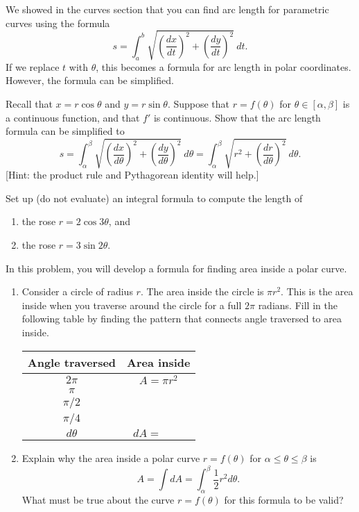 We showed in the curves section that you can find arc length for parametric curves using the formula 
$$s=\int_a^b\sqrt{\left(\frac{dx}{dt}\right)^2+\left(\frac{dy}{dt}\right)^2}\ dt.$$ If we replace $t$ with $\theta$, this becomes a formula for arc length in polar coordinates.  However, the formula can be simplified.

\begin{problem}
Recall that $x=r\cos\theta$ and $y=r\sin\theta$. Suppose that $r=f(\theta)$ for $\theta\in[\alpha,\beta]$ is a continuous function, and that $f'$ is continuous.  
Show that the arc length formula can be simplified to 
$$
s=\int_{\alpha}^{\beta}\sqrt{\left(\frac{dx}{d\theta}\right)^2+\left(\frac{dy}{d\theta}\right)^2}\ d\theta 
= \int_{\alpha}^{\beta}\sqrt{r^2+\left(\frac{dr}{d\theta}\right)^2} \ d\theta.$$
[Hint: the product rule and Pythagorean identity will help.]
\end{problem}

\begin{problem} 
Set up (do not evaluate) an integral formula to compute the length of 
\begin{enumerate}
\item the rose $r=2\cos 3\theta$, and
\item the rose $r=3\sin 2\theta$.
\end{enumerate}
\end{problem}


\begin{problem}
In this problem, you will develop a formula for finding area inside a polar curve.
\begin{enumerate}
\item 
Consider a circle of radius $r$. The area inside the circle is $\pi r^2$. This is the area inside when you traverse around the circle for a full $2\pi$ radians.  Fill in the following table by finding the pattern that connects angle traversed to area inside.
\begin{center}
\begin{tabular}{c|c}
Angle traversed& Area inside\\ \hline
$2\pi$ & $A=\pi r^2$\\
$\pi$ & \\
$\pi/2$ & \\
$\pi/4$ & \\
$d\theta$ & $dA=\quad\quad$
\end{tabular}
\end{center}
\item Explain why the area inside a polar curve $r=f(\theta)$ for $\alpha\leq \theta\leq \beta$ is $$A = \int dA = \int_\alpha^\beta \frac{1}{2}r^2d\theta.$$
What must be true about the curve $r=f(\theta)$ for this formula to be valid?
\end{enumerate}
\end{problem}

